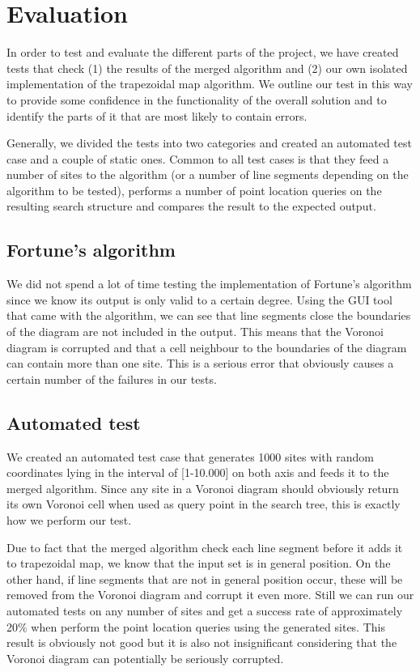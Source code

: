 \section{Evaluation}
In order to test and evaluate the different parts of the project, we have created tests that check (1) the results of the merged algorithm and (2) our own isolated implementation of the trapezoidal map algorithm. We outline our test in this way to provide some confidence in the functionality of the overall solution and to identify the parts of it that are most likely to contain errors. 

Generally, we divided the tests into two categories and created an automated test case and a couple of static ones. Common to all test cases is that they feed a number of sites to the algorithm (or a number of line segments depending on the algorithm to be tested), performs a number of point location queries on the resulting search structure and compares the result to the expected output.

\subsection{Fortune’s algorithm}
We did not spend a lot of time testing the implementation of Fortune’s algorithm since we know its output is only valid to a certain degree. Using the GUI tool that came with the algorithm, we can see that line segments close the boundaries of the diagram are not included in the output. This means that the Voronoi diagram is corrupted and that a cell neighbour to the boundaries of the diagram can contain more than one site. This is a serious error that obviously causes a certain number of the failures in our tests.

\subsection{Automated test}
We created an automated test case that generates 1000 sites with random coordinates lying in the interval of [1-10.000] on both axis and feeds it to the merged algorithm. Since any site in a Voronoi diagram should obviously return its own Voronoi cell when used as query point in the search tree, this is exactly how we perform our test.

Due to fact that the merged algorithm check each line segment before it adds it to trapezoidal map, we know that the input set is in general position. On the other hand, if line segments that are not in general position occur, these will be removed from the Voronoi diagram and corrupt it even more. Still we can run our automated tests on any number of sites and get a success rate of approximately 20\% when perform the point location queries using the generated sites. This result is obviously not good but it is also not insignificant considering that the Voronoi diagram can potentially be seriously corrupted. 

